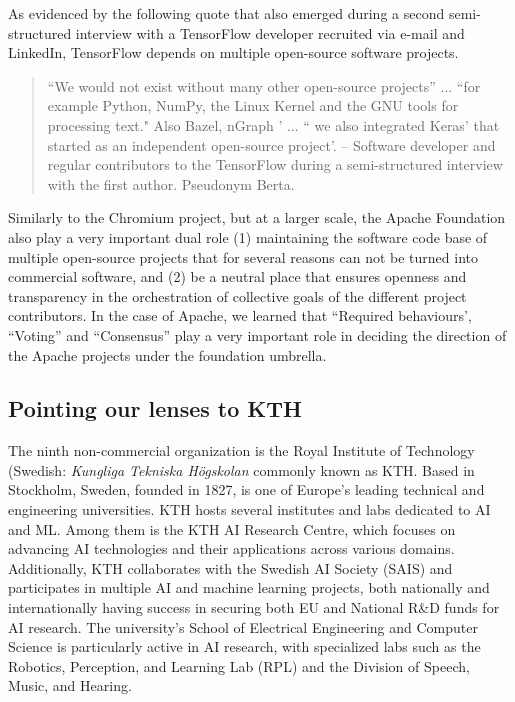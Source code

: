 \documentclass[CHICAGO,Times1COL]{WileyNJDv5} %
\begin{document}
As evidenced by the following quote that also emerged during a second semi-structured interview with a TensorFlow developer recruited via e-mail and LinkedIn, TensorFlow depends on multiple open-source software projects. 

\begin{quotation}
``We would not exist without many other open-source projects'' ... ``for example Python, NumPy, the Linux Kernel and the GNU tools for processing text." Also Bazel, nGraph ' ... `` we also integrated Keras' that started as an independent open-source project'.   -- Software developer  and regular contributors to the TensorFlow during a semi-structured interview with the first author.  Pseudonym Berta. 
\end{quotation}


Similarly to the Chromium project, but at a larger scale, the Apache Foundation also play a very important dual role (1) maintaining the software code base of multiple open-source projects that for several reasons can not be turned into commercial software, and (2) be a neutral place that ensures openness and transparency in the orchestration of collective goals of the different project contributors. In the case of Apache, we learned that ``Required behaviours', ``Voting'' and ``Consensus'' play a very important role in deciding the direction of the Apache projects under the foundation umbrella. 






\subsection{Pointing our lenses to KTH}


The ninth non-commercial organization is the Royal Institute of Technology (Swedish: \textit{Kungliga Tekniska Högskolan} commonly known as KTH. Based in Stockholm, Sweden, founded in 1827, is one of Europe's leading technical and engineering universities.  KTH hosts several institutes and labs dedicated to \ac{AI} and \ac{ML}. Among them is the KTH AI Research Centre, which focuses on advancing AI technologies and their applications across various domains. Additionally, KTH collaborates with the Swedish AI Society (SAIS) and participates in multiple AI and machine learning projects, both nationally and internationally having success in securing both EU  and National R\&D funds for AI research.  
The university's School of Electrical Engineering and Computer Science is particularly active in AI research, with specialized labs such as the Robotics, Perception, and Learning Lab (RPL) and the Division of Speech, Music, and Hearing. 
\end{document}
